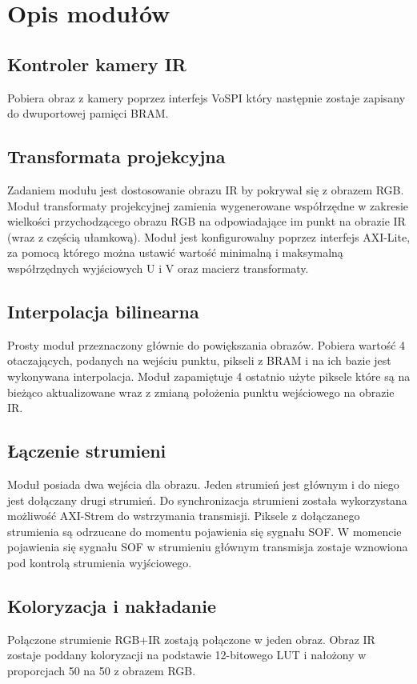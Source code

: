 \section{Opis modułów}
\subsection{Kontroler kamery IR}
Pobiera obraz z kamery poprzez interfejs VoSPI który następnie zostaje zapisany do dwuportowej pamięci BRAM. 
\subsection{Transformata projekcyjna}
Zadaniem modułu jest dostosowanie obrazu IR by pokrywał się z obrazem RGB. Moduł transformaty projekcyjnej zamienia wygenerowane współrzędne w zakresie wielkości przychodzącego obrazu RGB na odpowiadające im punkt na obrazie IR (wraz z częścią ułamkową). Moduł jest konfigurowalny poprzez interfejs AXI-Lite, za pomocą którego można ustawić wartość minimalną i maksymalną współrzędnych wyjściowych U i V oraz macierz transformaty.
\subsection{Interpolacja bilinearna}
Prosty moduł przeznaczony głównie do powiększania obrazów. Pobiera wartość 4 otaczających, podanych na wejściu punktu, pikseli z BRAM i na ich bazie jest wykonywana interpolacja. Moduł zapamiętuje 4 ostatnio użyte piksele które są na bieżąco aktualizowane wraz z zmianą położenia punktu wejściowego na obrazie IR.
\subsection{Łączenie strumieni}
Moduł posiada dwa wejścia dla obrazu. Jeden strumień jest głównym i do niego jest dołączany drugi strumień. Do synchronizacja strumieni została wykorzystana możliwość AXI-Strem do wstrzymania transmisji. Piksele z dołączanego strumienia są odrzucane do momentu pojawienia się sygnału SOF. W momencie pojawienia się sygnału SOF w strumieniu głównym transmisja zostaje wznowiona pod kontrolą strumienia wyjściowego. 
\subsection{Koloryzacja i nakładanie}
Połączone strumienie RGB+IR zostają połączone w jeden obraz. Obraz IR zostaje poddany koloryzacji na podstawie 12-bitowego LUT i nałożony w proporcjach 50 na 50 z obrazem RGB.

